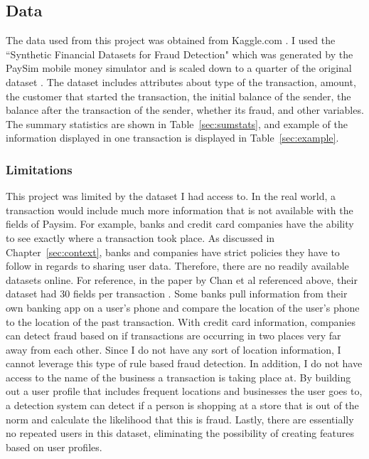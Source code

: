 \documentclass[midd]{thesis}
\begin{document}
\subsection{Data}


The data used from this project was obtained from Kaggle.com \cite{paysim}. I used the ``Synthetic Financial Datasets for Fraud Detection" which was generated by the PaySim mobile money simulator and is scaled down to a quarter of the original dataset \cite{paysim}. The dataset includes attributes about type of the transaction, amount, the customer that started the transaction, the initial balance of the sender, the balance after the transaction of the sender, whether its fraud, and other variables. The summary statistics are shown in Table~\ref{sec:sumstats}, and example of the information displayed in one transaction is displayed in Table~\ref{sec:example}.

\subsubsection{Limitations}

This project was limited by the dataset I had access to. In the real world, a transaction would include much more information that is not available with the fields of Paysim. For example, banks and credit card companies have the ability to see exactly where a transaction took place. As discussed in Chapter~\ref{sec:context}, banks and companies have strict policies they have to follow in regards to sharing user data. Therefore, there are no readily available datasets online. For reference, in the paper by Chan et al referenced above, their dataset had 30 fields per transaction \cite{Chan}. Some banks pull information from their own banking app on a user's phone and compare the location of the user's phone to the location of the past transaction. With credit card information, companies can detect fraud based on if transactions are occurring in two places very far away from each other. Since I do not have any sort of location information, I cannot leverage this type of rule based fraud detection. In addition, I do not have access to the name of the business a transaction is taking place at. By building out a user profile that includes frequent locations and businesses the user goes to, a detection system can detect if a person is shopping at a store that is out of the norm and calculate the likelihood that this is fraud. Lastly, there are essentially no repeated users in this dataset, eliminating the possibility of creating features based on user profiles.
\end{document}
